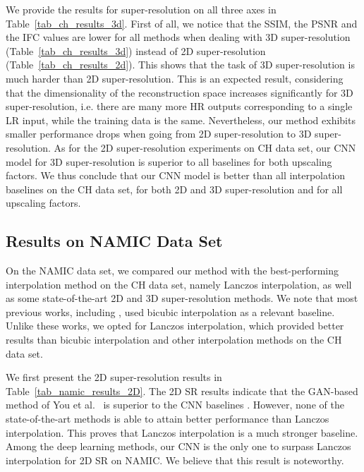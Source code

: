 \documentclass{ieeeaccess}
\begin{document}
We provide the results for super-resolution on all three axes in Table~\ref{tab_ch_results_3d}. First of all, we notice that the SSIM, the PSNR and the IFC values are lower for all methods when dealing with 3D super-resolution (Table~\ref{tab_ch_results_3d}) instead of 2D super-resolution (Table~\ref{tab_ch_results_2d}). This shows that the task of 3D super-resolution is much harder than 2D super-resolution. This is an expected result, considering that the dimensionality of the reconstruction space increases significantly for 3D super-resolution, i.e. there are many more HR outputs corresponding to a single LR input, while the training data is the same. Nevertheless, our method exhibits smaller performance drops when going from 2D super-resolution to 3D super-resolution. As for the 2D super-resolution experiments on CH data set, our CNN model for 3D super-resolution is superior to all baselines for both upscaling factors. We thus conclude that our CNN model is better than all interpolation baselines on the CH data set, for both 2D and 3D super-resolution and for all upscaling factors.

\subsection{Results on NAMIC Data Set}

On the NAMIC data set, we compared our method with the best-performing interpolation method on the CH data set, namely Lanczos interpolation, as well as some state-of-the-art 2D \cite{Du-AS-2019,You-TMI-2019,ZENG-CBM-2018} and 3D \cite{Pham-CMIG-2019} super-resolution methods. We note that most previous works, including \cite{Du-AS-2019,Pham-CMIG-2019,ZENG-CBM-2018}, used bicubic interpolation as a relevant baseline. Unlike these works, we opted for Lanczos interpolation, which provided better results than bicubic interpolation and other interpolation methods on the CH data set.

We first present the 2D super-resolution results in Table~\ref{tab_namic_results_2D}. The 2D SR results indicate that the GAN-based method of You et al.~\cite{You-TMI-2019} is superior to the CNN baselines \cite{Du-AS-2019,ZENG-CBM-2018}. However, none of the state-of-the-art methods \cite{Du-AS-2019,You-TMI-2019,ZENG-CBM-2018} is able to attain better performance than Lanczos interpolation. This proves that Lanczos interpolation is a much stronger baseline. Among the deep learning methods, our CNN is the only one to surpass Lanczos interpolation for 2D SR on NAMIC. We believe that this result is noteworthy.
\end{document}
